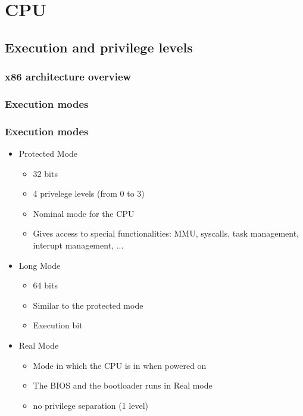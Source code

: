 

\section{CPU}

\subsection{Execution and privilege levels}
\subsubsection{x86 architecture overview}
\subsubsection{Execution modes}
\begin{frame}
        \frametitle{Execution modes}
        \begin{itemize}
        \item Protected Mode
                \begin{itemize}
                \item 32 bits
                \item 4 privelege levels (from 0 to 3)
                \item Nominal mode for the CPU
                \item Gives access to special functionalities: MMU,
                      syscalls, task management, interupt management, ...
                \end{itemize}
        \item Long Mode
                \begin{itemize}
                \item 64 bits
                \item Similar to the protected mode
                \item Execution bit
                \end{itemize}
        \item Real Mode
                \begin{itemize}
                \item Mode in which the CPU is in when powered on
                \item The BIOS and the bootloader runs in Real mode
                \item no privilege separation (1 level)
                \end{itemize}

\end{itemize}
\end{frame}

